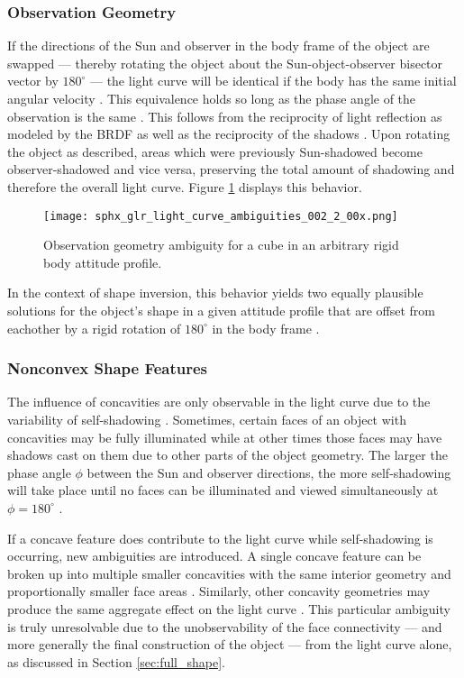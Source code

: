 \subsubsection{Observation Geometry}

If the directions of the Sun and observer in the body frame of the object are swapped --- thereby rotating the object about the Sun-object-observer bisector vector by $180^\circ$ --- the light curve will be identical if the body has the same initial angular velocity \cite{burton2023attitude}. This equivalence holds so long as the phase angle of the observation is the same \cite{burton2023attitude}. This follows from the reciprocity of light reflection as modeled by the BRDF as well as the reciprocity of the shadows \cite{burton2023attitude}. Upon rotating the object as described, areas which were previously Sun-shadowed become observer-shadowed and vice versa, preserving the total amount of shadowing and therefore the overall light curve. Figure \ref{fig:obs_amg} displays this behavior.

\begin{figure}[!htb]
  \centering
  \texttt{[image: sphx\_glr\_light\_curve\_ambiguities\_002\_2\_00x.png]}
  \caption{Observation geometry ambiguity for a cube in an arbitrary rigid body attitude profile.}
  \label{fig:obs_amg}
\end{figure}

In the context of shape inversion, this behavior yields two equally plausible solutions for the object's shape in a given attitude profile that are offset from eachother by a rigid rotation of $180^\circ$ in the body frame \cite{burton2023attitude}. 

\subsubsection{Nonconvex Shape Features}

The influence of concavities are only observable in the light curve due to the variability of self-shadowing \cite{durech2003}. Sometimes, certain faces of an object with concavities may be fully illuminated while at other times those faces may have shadows cast on them due to other parts of the object geometry. The larger the phase angle $\phi$ between the Sun and observer directions, the more self-shadowing will take place until no faces can be illuminated and viewed simultaneously at $\phi=180^\circ$ \cite{durech2003}.

If a concave feature does contribute to the light curve while self-shadowing is occurring, new ambiguities are introduced. A single concave feature can be broken up into multiple smaller concavities with the same interior geometry and proportionally smaller face areas \cite{durech2003}. Similarly, other concavity geometries may produce the same aggregate effect on the light curve \cite{durech2003}. This particular ambiguity is truly unresolvable due to the unobservability of the face connectivity --- and more generally the final construction of the object --- from the light curve alone, as discussed in Section \ref{sec:full_shape}.

